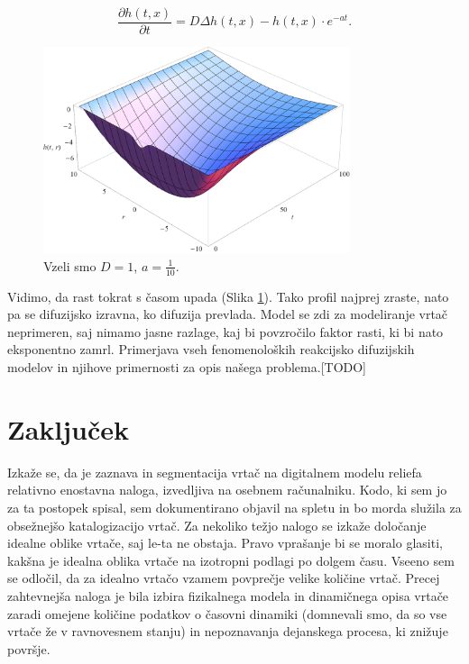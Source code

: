 \documentclass[a4paper, twoside, 12pt]{book}
\begin{document}
    \begin{equation}
      \frac{ \partial h(t,x) }{ \partial t} = D \Delta h(t,x) - h(t,x) \cdot e^{-a t}.
      \label{difuzija-gompertzova-rast}
    \end{equation}
    \begin{figure}[h]
      \begin{center}
        \includegraphics[width=9cm]{slike/difuzija-gompertzova-rast2}
      \end{center}
      \caption{Vzeli smo $D=1$, $a=\frac{1}{10}$.}
      \label{fig:difuzija-gompertzova-rast}
    \end{figure}

    Vidimo, da rast tokrat s časom upada (Slika \ref{fig:difuzija-gompertzova-rast}). Tako profil najprej zraste, nato pa se difuzijsko izravna, ko difuzija prevlada.
    Model se zdi za modeliranje vrtač neprimeren, saj nimamo jasne razlage, kaj bi povzročilo faktor rasti, ki bi nato eksponentno zamrl.
\newpage
[TODO]Primerjava vseh fenomenoloških reakcijsko difuzijskih modelov in njihove primernosti za opis našega problema.[TODO]

    \chapter{Zaključek}

    Izkaže se, da je zaznava in segmentacija vrtač na digitalnem modelu reliefa relativno enostavna naloga, izvedljiva na osebnem računalniku. Kodo, ki sem jo za ta postopek spisal, sem dokumentirano objavil na spletu in bo morda služila za obsežnejšo katalogizacijo vrtač.
    Za nekoliko težjo nalogo se izkaže določanje idealne oblike vrtače, saj le-ta ne obstaja. Pravo vprašanje bi se moralo glasiti, kakšna je idealna oblika vrtače na izotropni podlagi po dolgem času. Vseeno sem se odločil, da za idealno vrtačo vzamem povprečje velike količine vrtač.
    Precej zahtevnejša naloga je bila izbira fizikalnega modela in dinamičnega opisa vrtače zaradi omejene količine podatkov o časovni dinamiki (domnevali smo, da so vse vrtače že v ravnovesnem stanju) in nepoznavanja dejanskega procesa, ki znižuje površje.
\end{document}
